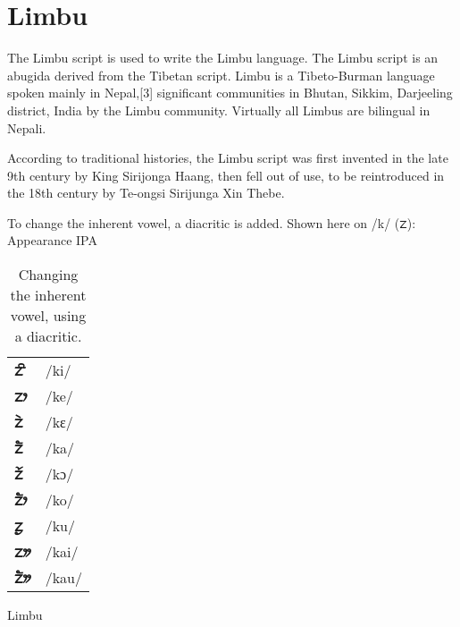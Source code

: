 
\section{Limbu}

The Limbu script is used to write the Limbu language. The Limbu script is an abugida derived from the Tibetan script. Limbu is a Tibeto-Burman language spoken mainly in Nepal,[3] significant communities in Bhutan, Sikkim, Darjeeling district, India by the Limbu community. Virtually all Limbus are bilingual in Nepali.

\newfontfamily{}

According to traditional histories, the Limbu script was first invented in the late 9th century by King Sirijonga Haang, then fell out of use, to be reintroduced in the 18th century by Te-ongsi Sirijunga Xin Thebe.

To change the inherent vowel, a diacritic is added. Shown here on /k/ ({\limbu ᤁ}):
Appearance	IPA

\begin{table}[htb]
\centering
\begin{tabular}{>{\Large\bfseries\limbu}l>{\arial}l}
ᤁᤡ	&/ki/\\
ᤁᤣ	&/ke/\\
ᤁᤧ	&/kɛ/\\
ᤁᤠ	&/ka/\\
ᤁᤨ	&/kɔ/\\
ᤁᤥ	&/ko/\\
ᤁᤢ	&/ku/\\
ᤁᤤ	&/kai/\\
ᤁᤦ	&/kau/\\
\end{tabular}
\caption{Changing the inherent vowel, using a diacritic.}
\end{table}




\begin{scriptexample}[]{Limbu}
\end{scriptexample}



